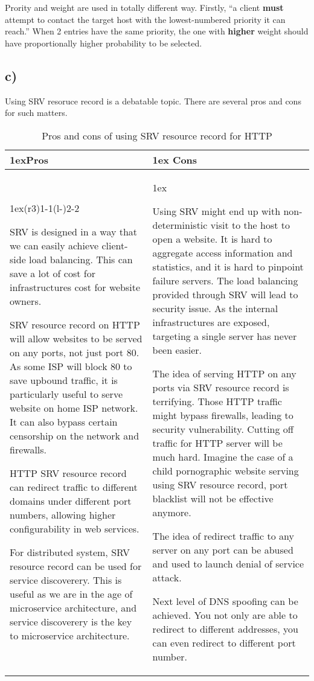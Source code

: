 \documentclass{article}
\begin{document}
   Prority and weight are used in totally different way. Firstly, ``a client \textbf{must} attempt to contact the target host with the lowest-numbered priority it
   can reach.'' When 2 entries have the same priority, the one with
   \textbf{higher} weight should have proportionally higher probability to be selected.
\subsection*{c)}
Using SRV resoruce record is a debatable topic. There are several pros and cons
for such matters.
\begin{table}[H]
\begin{tabularx}{\linewidth}{>{\parskip1ex}X@{\kern4\tabcolsep}>{\parskip1ex}X}
\toprule
\hfil\bfseries Pros
&
\hfil\bfseries Cons
\\\cmidrule(r{3\tabcolsep}){1-1}\cmidrule(l{-\tabcolsep}){2-2}

SRV is designed in a way that we can easily achieve client-side load balancing.
This can save a lot of cost for infrastructures cost for website owners.

SRV resource record on HTTP will allow websites to be served on any ports, not
just port 80. As some ISP will block 80 to save upbound traffic, it is
particularly useful to serve website on home ISP network. It can also bypass
certain censorship on the network and firewalls.

HTTP SRV resource record can redirect traffic to different domains under
different port numbers, allowing higher configurability in web services.

For distributed system, SRV resource record can be used for service discoverery.
This is useful as we are in the age of microservice architecture, and service
discoverery is the key to microservice architecture.

&

Using SRV might end up with non-deterministic visit to the host to open a
website. It is hard to aggregate access information and statistics, and it is
hard to pinpoint failure servers. The load balancing provided through SRV will
lead to security issue. As the internal infrastructures are exposed, targeting a
single server has never been easier.

The idea of serving HTTP on any ports via SRV resource record is terrifying.
Those HTTP traffic might bypass firewalls, leading to security vulnerability.
Cutting off traffic for HTTP server will be much hard. Imagine the case of a
child pornographic website serving using SRV resource record, port blacklist
will not be effective anymore.

The idea of redirect traffic to any server on any port can be abused and used to
launch denial of service attack.

Next level of DNS spoofing can be achieved. You not only are able to redirect to
different addresses, you can even redirect to different port number.


\\\bottomrule
\end{tabularx}
\caption{Pros and cons of using SRV resource record for HTTP}
\end{table}
\end{document}
